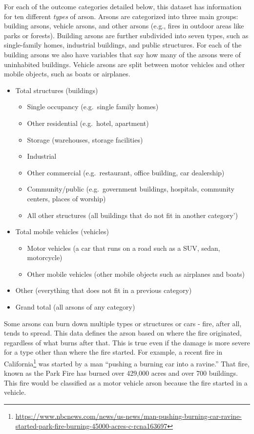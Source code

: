 \documentclass[
]{krantz}
\providecommand{\tightlist}{%
  \setlength{\itemsep}{0pt}\setlength{\parskip}{0pt}}
\renewcommand{\href}[2]{#2\footnote{\url{#1}}}
\begin{document}
For each of the outcome categories detailed below, this
dataset has information for ten different \emph{types} of
arson. Arsons are categorized into three main groups:
building arsons, vehicle arsons, and other arsons (e.g.,
fires in outdoor areas like parks or forests). Building
arsons are further subdivided into seven types, such as
single-family homes, industrial buildings, and public
structures. For each of the building arsons we also have
variables that say how many of the arsons were of
uninhabited buildings. Vehicle arsons are split between
motor vehicles and other mobile objects, such as boats or
airplanes.

\begin{itemize}
\tightlist
\item
  Total structures (buildings)

  \begin{itemize}
  \tightlist
  \item
    Single occupancy (e.g.~single family homes)
  \item
    Other residential (e.g.~hotel, apartment)
  \item
    Storage (warehouses, storage facilities)
  \item
    Industrial
  \item
    Other commercial (e.g.~restaurant, office building, car
    dealership)
  \item
    Community/public (e.g.~government buildings, hospitals,
    community centers, places of worship)
  \item
    All other structures (all buildings that do not fit in
    another category')
  \end{itemize}
\item
  Total mobile vehicles (vehicles)

  \begin{itemize}
  \tightlist
  \item
    Motor vehicles (a car that runs on a road such as a SUV,
    sedan, motorcycle)
  \item
    Other mobile vehicles (other mobile objects such as
    airplanes and boats)
  \end{itemize}
\item
  Other (everything that does not fit in a previous
  category)
\item
  Grand total (all arsons of any category)
\end{itemize}

Some arsons can burn down multiple types or structures or
cars - fire, after all, tends to spread. This data defines
the arson based on where the fire originated, regardless of
what burns after that. This is true even if the damage is
more severe for a type other than where the fire started.
For example, a
\href{https://www.nbcnews.com/news/us-news/man-pushing-burning-car-ravine-started-park-fire-burning-45000-acres-c-rcna163697}{recent
fire in California} was started by a man ``pushing a burning
car into a ravine.'' That fire, known as the Park Fire has
burned over 429,000 acres and over 700 buildings. This fire
would be classified as a motor vehicle arson because the
fire started in a vehicle.
\end{document}
